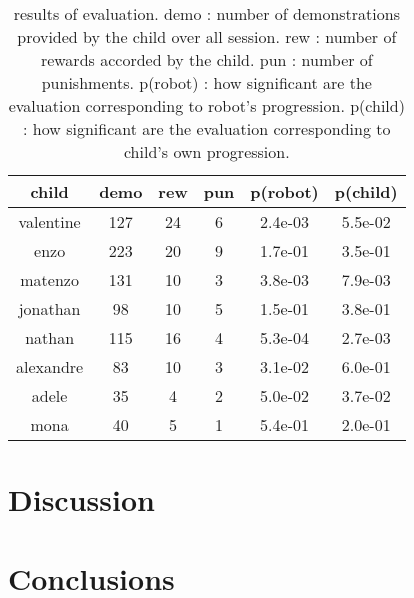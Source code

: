 \documentclass{sig-alternate}
\begin{document}
\begin{table}
    \centering
    \begin{tabular}{|c|c|c|c|c|c|}
        \hline
        child & demo & rew & pun & p(robot) & p(child)\\ \hline
        valentine & 127 & 24 & 6 & 2.4e-03 & 5.5e-02\\ \hline
        enzo & 223 & 20 & 9 & 1.7e-01 & 3.5e-01\\ \hline
        matenzo & 131 & 10 & 3 & 3.8e-03 & 7.9e-03\\ \hline
        jonathan & 98 & 10 & 5 &  1.5e-01 & 3.8e-01\\ \hline
        nathan & 115 & 16 & 4 & 5.3e-04 & 2.7e-03\\ \hline
        alexandre & 83 & 10 & 3 & 3.1e-02 & 6.0e-01\\ \hline
        adele & 35 & 4 & 2 & 5.0e-02 & 3.7e-02\\ \hline
        mona & 40 & 5 & 1 &  5.4e-01 & 2.0e-01\\ \hline
    \end{tabular}
    \caption{results of evaluation. demo : number of demonstrations provided by
        the child over all session. rew : number of rewards accorded by
        the child. pun : number of punishments. p(robot) : how
        significant are the evaluation corresponding to robot's progression. p(child) : how significant are the evaluation corresponding to child's own progression.}
    \label{table:scores}
\end{table}


\section{Discussion}

\section{Conclusions}


 
\end{document}
